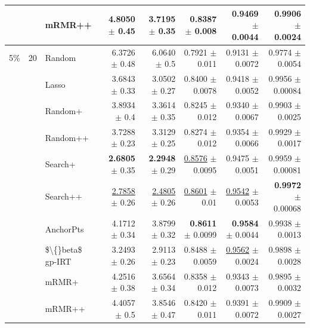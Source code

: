 \begin{longtable}{llp{}rrrrr}
 &  & mRMR++ & 4.8050 {\scriptsize $\pm$ 0.45} & 3.7195 {\scriptsize $\pm$ 0.35} & 0.8387 {\scriptsize $\pm$ 0.008} & \textbf{0.9469} {\scriptsize $\pm$ 0.0044} & 0.9906 {\scriptsize $\pm$ 0.0024} \\
\midrule
5\% & 20 & Random & 6.3726 {\scriptsize $\pm$ 0.48} & 6.0640 {\scriptsize $\pm$ 0.5} & 0.7921 {\scriptsize $\pm$ 0.011} & 0.9131 {\scriptsize $\pm$ 0.0072} & 0.9774 {\scriptsize $\pm$ 0.0054} \\
 &  & Lasso & 3.6843 {\scriptsize $\pm$ 0.33} & 3.0502 {\scriptsize $\pm$ 0.27} & 0.8400 {\scriptsize $\pm$ 0.0078} & 0.9418 {\scriptsize $\pm$ 0.0052} & 0.9956 {\scriptsize $\pm$ 0.00084} \\
 &  & Random+ & 3.8934 {\scriptsize $\pm$ 0.4} & 3.3614 {\scriptsize $\pm$ 0.35} & 0.8245 {\scriptsize $\pm$ 0.012} & 0.9340 {\scriptsize $\pm$ 0.0067} & 0.9903 {\scriptsize $\pm$ 0.0025} \\
 &  & Random++ & 3.7288 {\scriptsize $\pm$ 0.23} & 3.3129 {\scriptsize $\pm$ 0.25} & 0.8274 {\scriptsize $\pm$ 0.012} & 0.9354 {\scriptsize $\pm$ 0.0066} & 0.9929 {\scriptsize $\pm$ 0.0017} \\
 &  & Search+ & \textbf{2.6805} {\scriptsize $\pm$ 0.35} & \textbf{2.2948} {\scriptsize $\pm$ 0.29} & \underline{0.8576} {\scriptsize $\pm$ 0.0095} & 0.9475 {\scriptsize $\pm$ 0.0051} & 0.9959 {\scriptsize $\pm$ 0.00081} \\
 &  & Search++ & \underline{2.7858} {\scriptsize $\pm$ 0.26} & \underline{2.4805} {\scriptsize $\pm$ 0.26} & \underline{0.8601} {\scriptsize $\pm$ 0.01} & \underline{0.9542} {\scriptsize $\pm$ 0.0053} & \textbf{0.9972} {\scriptsize $\pm$ 0.00068} \\
 &  & AnchorPts & 4.1712 {\scriptsize $\pm$ 0.34} & 3.8799 {\scriptsize $\pm$ 0.32} & \textbf{0.8611} {\scriptsize $\pm$ 0.0099} & \textbf{0.9584} {\scriptsize $\pm$ 0.0044} & 0.9938 {\scriptsize $\pm$ 0.0013} \\
 &  & \$\textbackslash\{\}beta\$ gp-IRT & 3.2493 {\scriptsize $\pm$ 0.26} & 2.9113 {\scriptsize $\pm$ 0.23} & 0.8488 {\scriptsize $\pm$ 0.0059} & \underline{0.9562} {\scriptsize $\pm$ 0.0024} & 0.9898 {\scriptsize $\pm$ 0.0028} \\
 &  & mRMR+ & 4.2516 {\scriptsize $\pm$ 0.38} & 3.6564 {\scriptsize $\pm$ 0.34} & 0.8358 {\scriptsize $\pm$ 0.012} & 0.9343 {\scriptsize $\pm$ 0.0073} & 0.9895 {\scriptsize $\pm$ 0.0032} \\
 &  & mRMR++ & 4.4057 {\scriptsize $\pm$ 0.5} & 3.8546 {\scriptsize $\pm$ 0.47} & 0.8420 {\scriptsize $\pm$ 0.011} & 0.9391 {\scriptsize $\pm$ 0.0072} & 0.9909 {\scriptsize $\pm$ 0.0027} \\

\end{longtable}
